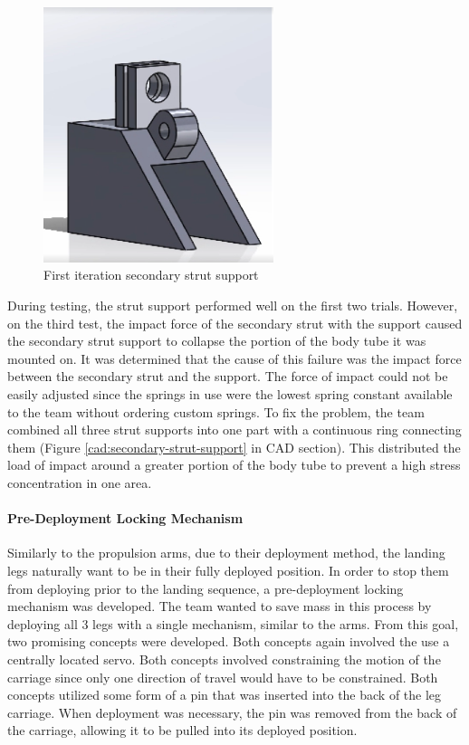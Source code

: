 \begin{figure}
    \centering
    \includegraphics[width=0.6\textwidth]{src/figs/cad-and-dwgs/original-secondary-strut-support.png}
    \caption{First iteration secondary strut support}
    \label{original-secondary-strut-support}
\end{figure}

During testing, the strut support performed well on the first two trials. However, on the third test, the impact force of the secondary strut with the support caused the secondary strut support to collapse the portion of the body tube it was mounted on. It was determined that the cause of this failure was the impact force between the secondary strut and the support. The force of impact could not be easily adjusted since the springs in use were the lowest spring constant available to the team without ordering custom springs. To fix the problem, the team combined all three strut supports into one part with a continuous ring connecting them (Figure \ref{cad:secondary-strut-support} in CAD section). This distributed the load of impact around a greater portion of the body tube to prevent a high stress concentration in one area. 

\paragraph{Pre-Deployment Locking Mechanism}
\label{legpredeploymentlock}
Similarly to the propulsion arms, due to their deployment method, the landing legs naturally want to be in their fully deployed position. In order to stop them from deploying prior to the landing sequence, a pre-deployment locking mechanism was developed. The team wanted to save mass in this process by deploying all 3 legs with a single mechanism, similar to the arms. From this goal, two promising concepts were developed. Both concepts again involved the use a centrally located servo. Both concepts involved constraining the motion of the carriage since only one direction of travel would have to be constrained. Both concepts utilized some form of a pin that was inserted into the back of the leg carriage. When deployment was necessary, the pin was removed from the back of the carriage, allowing it to be pulled into its deployed position. 

